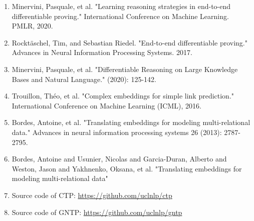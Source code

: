 \documentclass[Other]{iitddiss}
\begin{document}
\begin{enumerate}
\item Minervini, Pasquale, et al. "Learning reasoning strategies in end-to-end differentiable proving." International Conference on Machine Learning. PMLR, 2020.
\item Rocktäschel, Tim, and Sebastian Riedel. "End-to-end differentiable proving." Advances in Neural Information Processing Systems. 2017.
\item Minervini, Pasquale, et al. "Differentiable Reasoning on Large Knowledge Bases and Natural Language." (2020): 125-142.
\item Trouillon, Théo, et al. "Complex embeddings for simple link prediction." International Conference on Machine Learning (ICML), 2016.
\item Bordes, Antoine, et al. "Translating embeddings for modeling multi-relational data." Advances in neural information processing systems 26 (2013): 2787-2795.
\item Bordes, Antoine and Usunier, Nicolas and Garcia-Duran, Alberto and Weston, Jason and Yakhnenko, Oksana, et al. "Translating embeddings for modeling multi-relational data"
\item Source code of CTP: \url{https://github.com/uclnlp/ctp}
\item Source code of GNTP: \url{https://github.com/uclnlp/gntp}
\end{enumerate}
\end{document}
